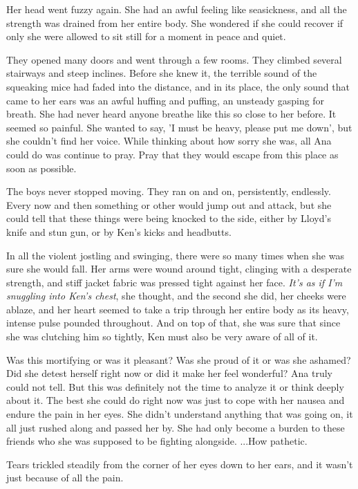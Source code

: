 \documentclass[
]{article}
\begin{document}
Her head went fuzzy again. She had an awful feeling like seasickness,
and all the strength was drained from her entire body. She wondered if
she could recover if only she were allowed to sit still for a moment in
peace and quiet.

They opened many doors and went through a few rooms. They climbed
several stairways and steep inclines. Before she knew it, the terrible
sound of the squeaking mice had faded into the distance, and in its
place, the only sound that came to her ears was an awful huffing and
puffing, an unsteady gasping for breath. She had never heard anyone
breathe like this so close to her before. It seemed so painful. She
wanted to say, 'I must be heavy, please put me down', but she couldn't
find her voice. While thinking about how sorry she was, all Ana could do
was continue to pray. Pray that they would escape from this place as
soon as possible.

The boys never stopped moving. They ran on and on, persistently,
endlessly. Every now and then something or other would jump out and
attack, but she could tell that these things were being knocked to the
side, either by Lloyd's knife and stun gun, or by Ken's kicks and
headbutts.

In all the violent jostling and swinging, there were so many times when
she was sure she would fall. Her arms were wound around tight, clinging
with a desperate strength, and stiff jacket fabric was pressed tight
against her face. \emph{It's as if I'm snuggling into Ken's chest}, she
thought, and the second she did, her cheeks were ablaze, and her heart
seemed to take a trip through her entire body as its heavy, intense
pulse pounded throughout. And on top of that, she was sure that since
she was clutching him so tightly, Ken must also be very aware of all of
it.

Was this mortifying or was it pleasant? Was she proud of it or was she
ashamed? Did she detest herself right now or did it make her feel
wonderful? Ana truly could not tell. But this was definitely not the
time to analyze it or think deeply about it. The best she could do right
now was just to cope with her nausea and endure the pain in her eyes.
She didn't understand anything that was going on, it all just rushed
along and passed her by. She had only become a burden to these friends
who she was supposed to be fighting alongside. ...How pathetic.

Tears trickled steadily from the corner of her eyes down to her ears,
and it wasn't just because of all the pain.
\end{document}
